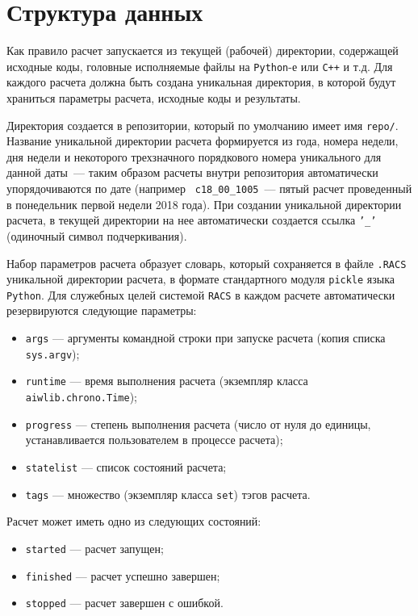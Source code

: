 \section{Структура данных}
Как правило расчет запускается из текущей (рабочей) директории,
содержащей исходные коды, головные исполняемые файлы на {\tt Python}-е или \verb'C++' и т.д. 
Для каждого расчета должна быть создана уникальная директория, в которой будут
храниться параметры расчета, исходные коды и результаты. 

Директория создается в репозитории, который по умолчанию
имеет имя {\tt repo/}. 
Название уникальной директории расчета формируется из
года, номера недели, дня недели и некоторого трехзначного порядкового номера
уникального для данной даты~--- таким образом расчеты внутри
репозитория автоматически
упорядочиваются по дате (например {\tt
  c18\_00\_1005}~--- пятый расчет проведенный в понедельник первой недели 2018
года). При создании уникальной директории расчета,  в текущей директории 
на нее автоматически создается ссылка {\tt '\_'} (одиночный символ подчеркивания).

Набор параметров расчета образует словарь, который сохраняется 
в файле \verb'.RACS' уникальной директории расчета, в формате стандартного модуля \verb'pickle'
языка \verb'Python'. 
Для служебных целей системой {\tt RACS} в каждом расчете автоматически резервируются
следующие параметры:
\begin{itemize}
\item {\tt args} --- аргументы командной строки при запуске расчета (копия
  списка {\tt sys.argv});
\item {\tt runtime} --- время выполнения расчета (экземпляр класса \verb'aiwlib.chrono.Time');
\item {\tt progress} --- степень выполнения расчета (число от нуля до
  единицы, устанавливается пользователем в процессе расчета);
\item {\tt statelist} --- список состояний расчета;
\item {\tt tags} --- множество (экземпляр класса \verb'set') тэгов расчета.
\end{itemize}

Расчет может иметь одно из следующих состояний:
\begin{itemize}
\item {\tt started} --- расчет запущен;
\item {\tt finished} --- расчет успешно завершен;
\item {\tt stopped} --- расчет завершен с ошибкой.
\end{itemize}

